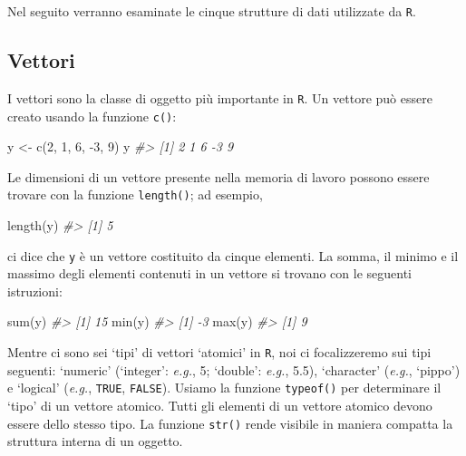 \documentclass[
  11pt,
]{krantz}
\makeatletter
\newenvironment{Shaded}{\begin{snugshade}}{\end{snugshade}}
\newcommand{\CommentTok}[1]{\textcolor[rgb]{0.37,0.37,0.37}{\textit{#1}}}
\newcommand{\DecValTok}[1]{\textcolor[rgb]{0.06,0.06,0.06}{#1}}
\newcommand{\FunctionTok}[1]{\textcolor[rgb]{0,0,0}{#1}}
\newcommand{\NormalTok}[1]{#1}
\newcommand{\OtherTok}[1]{\textcolor[rgb]{0.37,0.37,0.37}{#1}}
\newcommand{\SpecialCharTok}[1]{\textcolor[rgb]{0,0,0}{#1}}
\newenvironment{kframe}{%
\medskip{}
\setlength{\fboxsep}{.8em}
 \def\at@end@of@kframe{}%
 \ifinner\ifhmode%
  \def\at@end@of@kframe{\end{minipage}}%
  \begin{minipage}{\columnwidth}%
 \fi\fi%
 \def\FrameCommand##1{\hskip\@totalleftmargin \hskip-\fboxsep
 \colorbox{shadecolor}{##1}\hskip-\fboxsep
     \hskip-\linewidth \hskip-\@totalleftmargin \hskip\columnwidth}%
 \MakeFramed {\advance\hsize-\width
   \@totalleftmargin\z@ \linewidth\hsize
   \@setminipage}}%
 {\par\unskip\endMakeFramed%
 \at@end@of@kframe}
\renewenvironment{Shaded}{\begin{kframe}}{\end{kframe}}
\theoremstyle{definition}
\theoremstyle{definition}
\theoremstyle{definition}
\theoremstyle{definition}
\theoremstyle{remark}
\makeatother
\begin{document}
Nel seguito verranno esaminate le cinque strutture di dati utilizzate da \texttt{R}.

\hypertarget{vettori}{%
\subsection{Vettori}\label{vettori}}

I vettori sono la classe di oggetto più importante in \texttt{R}. Un vettore può essere creato usando la funzione \texttt{c()}:

\begin{Shaded}
\begin{Highlighting}[]
\NormalTok{y }\OtherTok{\textless{}{-}} \FunctionTok{c}\NormalTok{(}\DecValTok{2}\NormalTok{, }\DecValTok{1}\NormalTok{, }\DecValTok{6}\NormalTok{, }\SpecialCharTok{{-}}\DecValTok{3}\NormalTok{, }\DecValTok{9}\NormalTok{)}
\NormalTok{y}
\CommentTok{\#\textgreater{} [1]  2  1  6 {-}3  9}
\end{Highlighting}
\end{Shaded}

Le dimensioni di un vettore presente nella memoria di lavoro possono essere trovare con la funzione \texttt{length()}; ad esempio,

\begin{Shaded}
\begin{Highlighting}[]
\FunctionTok{length}\NormalTok{(y)}
\CommentTok{\#\textgreater{} [1] 5}
\end{Highlighting}
\end{Shaded}

ci dice che \texttt{y} è un vettore costituito da cinque elementi. La somma, il minimo e il massimo degli elementi contenuti in un vettore si trovano con le seguenti istruzioni:

\begin{Shaded}
\begin{Highlighting}[]
\FunctionTok{sum}\NormalTok{(y)}
\CommentTok{\#\textgreater{} [1] 15}
\FunctionTok{min}\NormalTok{(y)}
\CommentTok{\#\textgreater{} [1] {-}3}
\FunctionTok{max}\NormalTok{(y)}
\CommentTok{\#\textgreater{} [1] 9}
\end{Highlighting}
\end{Shaded}

Mentre ci sono sei `tipi' di vettori `atomici' in \texttt{R}, noi ci focalizzeremo sui tipi seguenti: `numeric' (`integer': \emph{e.g.}, 5; `double': \emph{e.g.}, 5.5), `character' (\emph{e.g.}, `pippo') e `logical' (\emph{e.g.}, \texttt{TRUE}, \texttt{FALSE}). Usiamo la funzione \texttt{typeof()} per determinare il `tipo' di un vettore atomico. Tutti gli elementi di un vettore atomico devono essere dello stesso tipo. La funzione \texttt{str()} rende visibile in maniera compatta la struttura interna di un oggetto.
\end{document}
